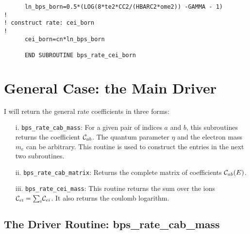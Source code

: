 \documentclass[preprint,12pt,eqsecnum,nofootinbib,amsmath,amssymb]{revtex4}
\newcommand{\smI}{{\rm\scriptscriptstyle I}}
\begin{document}
{\begin{verbatim}
      ln_bps_born=0.5*(LOG(8*te2*CC2/(HBARC2*ome2)) -GAMMA - 1)
!
! construct rate: cei_born
!
      cei_born=cn*ln_bps_born

      END SUBROUTINE bps_rate_cei_born
\end{verbatim}

\pagebreak
\section{General Case: the Main Driver}

I will return the general rate coefficients in three forms:
\begin{enumerate}
  \baselineskip 10pt plus 1pt minus 1pt
  \setlength{\itemsep}{3pt} %
  \setlength{\parskip}{1pt} %
  \setlength{\parsep}{0pt}  %

\item[i.] \verb+bps_rate_cab_mass+: For a given pair of indices $a$
  and $b$, this subroutines returns the coefficient ${\cal C}_{ab}$.
  The quantum parameter $\eta$ and the electron mass $m_e$ can be
  arbitrary. This routine is used to construct the entries in the next
  two subroutines.

\item[ii.] \verb+bps_rate_cab_matrix+: Returns the complete matrix of
coefficients ${\cal C}_{ab}(E)$.

\item[iii.] \verb+bps_rate_cei_mass+: This routine returns the sum
over the ions ${\cal C}_{e\smI}={\sum}_i {\cal C}_{ei}$. It also
returns the coulomb logarithm.
\end{enumerate}

\subsection{The Driver Routine: bps\_rate\_cab\_mass}

}
\end{document}
